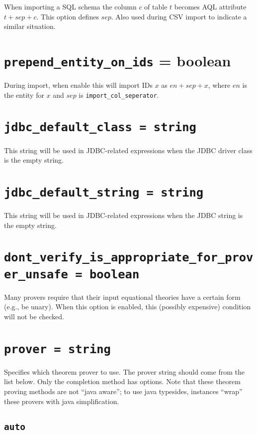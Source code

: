 \documentclass[10pt]{book}
\begin{document}
When importing a SQL schema the column $c$ of table $t$ becomes AQL attribute $t + sep + c$.  This option defines $sep$.  Also used during CSV import to indicate a similar situation.

\section{ {\tt prepend\_entity\_on\_ids} = boolean }

During import, when enable this will import IDs $x$ as $en + sep + x$, where $en$ is the entity for $x$ and $sep$ is  {\tt import\_col\_seperator}. 

\section{ {\tt jdbc\_default\_class = string } }

This string will be used in JDBC-related expressions when the JDBC driver class is the empty string.

\section{ {\tt jdbc\_default\_string = string } }

This string will be used in JDBC-related expressions when the JDBC string is the empty string.

\section{{\tt dont\_verify\_is\_appropriate\_for\_prover\_unsafe = boolean}}
Many provers require that their input equational theories have a certain form (e.g., be unary).  When this option is enabled, this (possibly expensive) condition will not be checked.
				
\section{{\tt prover = string}}
Specifies which theorem prover to use.  The prover string should come from the list below.  Only the completion method has options.  Note that these theorem proving methods are not ``java aware''; to use java typesides, instances ``wrap'' these provers with java simplification.

\subsection{{\tt auto}}
\end{document}
